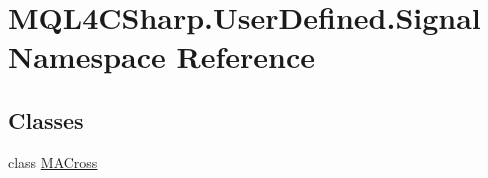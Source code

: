 \hypertarget{namespace_m_q_l4_c_sharp_1_1_user_defined_1_1_signal}{}\section{M\+Q\+L4\+C\+Sharp.\+User\+Defined.\+Signal Namespace Reference}
\label{namespace_m_q_l4_c_sharp_1_1_user_defined_1_1_signal}
\subsection*{Classes}
\begin{DoxyCompactItemize}
\item 
class \hyperlink{class_m_q_l4_c_sharp_1_1_user_defined_1_1_signal_1_1_m_a_cross}{M\+A\+Cross}
\end{DoxyCompactItemize}
